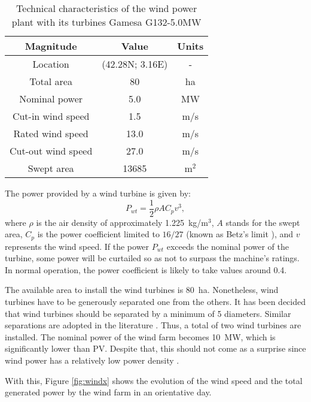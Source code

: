 \begin{table}[!htb]\centering
  \begin{tabular}{ccc}
    \hline
    \textbf{Magnitude} & \textbf{Value} & \textbf{Units}\\
    \hline
    Location & (42.28N; 3.16E) & -\\
    Total area & 80 & ha \\
    Nominal power & 5.0 & MW\\
    Cut-in wind speed & 1.5 & m/s\\
    Rated wind speed & 13.0 & m/s\\
    Cut-out wind speed & 27.0 & m/s\\
    Swept area & 13685 & m$^2$\\
    \hline
  \end{tabular}
  \caption{Technical characteristics of the wind power plant with its turbines Gamesa G132-5.0MW \cite{gamesa}}
  \label{tab:wind}
\end{table}
The power provided by a wind turbine is given by:
\begin{equation}
  P_{wt} = \frac{1}{2}\rho A C_p v^3,
\end{equation}
where  $\rho$ is the air density of approximately 1.225~kg/m$^3$, $A$ stands for the swept area, $C_p$ is the power coefficient limited to $16/27$ (known as Betz's limit \cite{ragheb2014wind}), and $v$ represents the wind speed. If the power $P_{wt}$ exceeds the nominal power of the turbine, some power will be curtailed so as not to surpass the machine's ratings. In normal operation, the power coefficient is likely to take values around 0.4.

The available area to install the wind turbines is 80~ha. Nonetheless, wind turbines have to be generously separated one from the others. It has been decided that wind turbines should be separated by a minimum of 5 diameters. Similar separations are adopted in the literature \cite{bartl2012wake}. Thus, a total of two wind turbines are installed. The nominal power of the wind farm becomes 10~MW, which is significantly lower than PV. Despite that, this should not come as a surprise since wind power has a relatively low power density \cite{smil2015power}.  

With this, Figure \ref{fig:windx} shows the evolution of the wind speed and the total generated power by the wind farm in an orientative day. 

